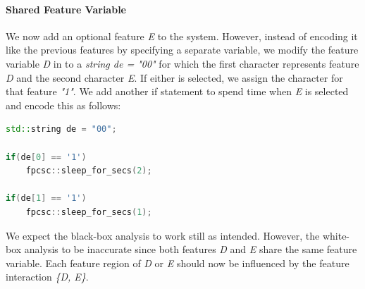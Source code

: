 \paragraph{Shared Feature Variable}\label{ground-truth:Shared}
We now add an optional feature \emph{E} to the system. 
However, instead of encoding it like the previous features by specifying a separate variable, 
we modify the feature variable \emph{D} in  to a \emph{string de = "00"} 
for which the first character represents feature \emph{D} and the second character \emph{E}. If either is selected, 
we assign the character for that feature \emph{"1"}. We add another if statement to spend time when \emph{E} is selected and encode this as follows:

\begin{minipage}{\linewidth}
\begin{lstlisting}[language=C++,label={lst:shared},escapechar=|]
std::string de = "00";

if(de[0] == '1')
    fpcsc::sleep_for_secs(2);

if(de[1] == '1')
    fpcsc::sleep_for_secs(1);
\end{lstlisting}
\end{minipage}

We expect the black-box analysis to work still as intended. 
However, the white-box analysis to be inaccurate since both features \emph{D} and \emph{E} share the same feature variable. 
Each feature region of \emph{D} or \emph{E} should now be influenced by the feature interaction \emph{\{D, E\}}.